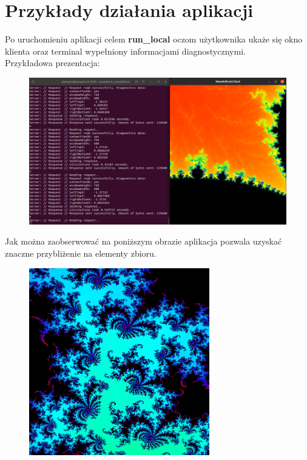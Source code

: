 \section{Przykłady działania aplikacji}
Po uruchomieniu aplikacji celem \textbf{run\_local} oczom użytkownika ukaże się
okno klienta oraz terminal wypełniony informacjami diagnostycznymi.\\

Przykładowa prezentacja:
\begin{figure}[H]
    \centering
    \includegraphics[width = \textwidth]{img/ex2.png}
\end{figure}

Jak można zaobserwować na poniższym obrazie aplikacja pozwala uzyskać znaczne przybliżenie na elementy zbioru.
\begin{figure}[H]
    \centering
    \includegraphics[width = 0.7\textwidth]{img/ex3.png}
\end{figure}